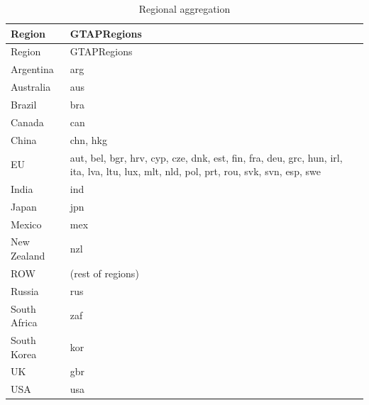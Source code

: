\documentclass[
  authoryear,
  doubleblind]{elsarticle}
\begin{document}
\scriptsize

\begin{longtable}[]{@{}
  >{\raggedright\arraybackslash}p{}
  >{\raggedright\arraybackslash}p{}@{}}
\caption{Regional aggregation }\label{tbl-regions}\tabularnewline
\toprule\noalign{}
\begin{minipage}[b]{\linewidth}\raggedright
Region
\end{minipage} & \begin{minipage}[b]{\linewidth}\raggedright
GTAPRegions
\end{minipage} \\
\midrule\noalign{}
\endfirsthead
\toprule\noalign{}
\begin{minipage}[b]{\linewidth}\raggedright
Region
\end{minipage} & \begin{minipage}[b]{\linewidth}\raggedright
GTAPRegions
\end{minipage} \\
\midrule\noalign{}
\endhead
\bottomrule\noalign{}
\endlastfoot
Argentina & arg \\
Australia & aus \\
Brazil & bra \\
Canada & can \\
China & chn, hkg \\
EU & aut, bel, bgr, hrv, cyp, cze, dnk, est, fin, fra, deu, grc, hun,
irl, ita, lva, ltu, lux, mlt, nld, pol, prt, rou, svk, svn, esp, swe \\
India & ind \\
Japan & jpn \\
Mexico & mex \\
New Zealand & nzl \\
ROW & (rest of regions) \\
Russia & rus \\
South Africa & zaf \\
South Korea & kor \\
UK & gbr \\
USA & usa \\
\end{longtable}

\normalsize

\scriptsize
\end{document}
